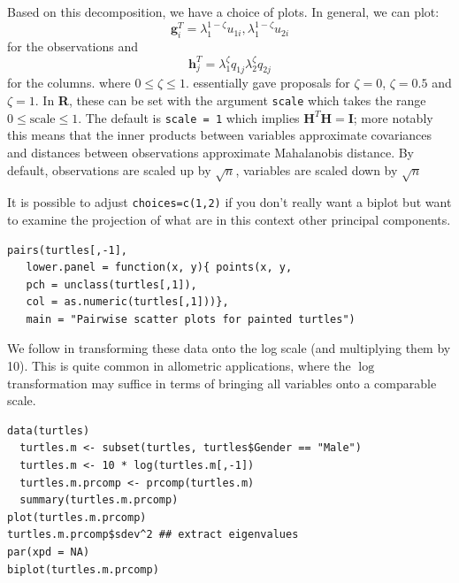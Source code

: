 Based on this decomposition, we have a choice of plots.   In general, we can plot:
\begin{displaymath}
\boldsymbol{g}_{i}^{T} = \lambda_{1}^{1-\zeta} u_{1i}, \lambda_{1}^{1-\zeta} u_{2i}
\end{displaymath}
for the observations
and
\begin{displaymath}
\boldsymbol{h}^{T}_{j} = \lambda_{1}^{\zeta} q_{1j} \lambda_{2}^{\zeta} q_{2j}
\end{displaymath}
for the columns.
where $0 \leq \zeta \leq 1$.   \cite{Gabriel:1971} essentially gave proposals for $\zeta = 0$, $\zeta = 0.5$ and $\zeta = 1$.   In \textbf{R}, these can be set with the argument \verb+scale+ which takes the range $0 \leq \mbox{scale} \leq 1$.   The default is \verb+scale = 1+ which implies $\boldsymbol{H}^{T}\boldsymbol{H} = \boldsymbol{I}$; more notably this means that the inner products between variables approximate covariances and distances between observations approximate Mahalanobis distance.    By default, observations are scaled up by $\sqrt{n}$, variables are scaled down by $\sqrt{n}$

It is possible to adjust \verb+choices=c(1,2)+ if you don't really want a biplot but want to examine the projection of what are in this context other principal components.


\singlespacing
\begin{verbatim}
pairs(turtles[,-1],
   lower.panel = function(x, y){ points(x, y,
   pch = unclass(turtles[,1]),
   col = as.numeric(turtles[,1]))},
   main = "Pairwise scatter plots for painted turtles")
\end{verbatim}
\onehalfspacing

We follow \cite{Flury:1997} in transforming these data onto the log scale (and multiplying them by 10).   This is quite common in allometric applications, where the $\log$ transformation may suffice in terms of bringing all variables onto a comparable scale.

\singlespacing
\begin{verbatim}
data(turtles)
  turtles.m <- subset(turtles, turtles$Gender == "Male")
  turtles.m <- 10 * log(turtles.m[,-1])
  turtles.m.prcomp <- prcomp(turtles.m)
  summary(turtles.m.prcomp)
plot(turtles.m.prcomp)
turtles.m.prcomp$sdev^2 ## extract eigenvalues
par(xpd = NA)
biplot(turtles.m.prcomp)
\end{verbatim}
\onehalfspacing



